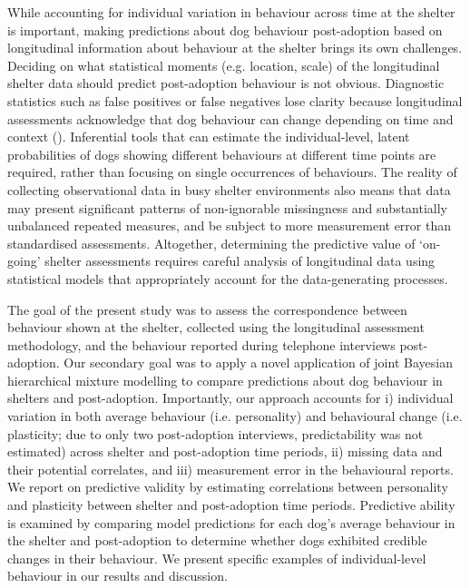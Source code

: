 \documentclass[fleqn,10pt]{wlscirep}
\begin{document}
While accounting for individual variation in behaviour across time at the shelter is important, making predictions about dog behaviour post-adoption based on longitudinal information about behaviour at the shelter brings its own challenges. Deciding on what statistical moments (e.g. location, scale) of the longitudinal shelter data should predict post-adoption behaviour is not obvious. Diagnostic statistics such as false positives or false negatives lose clarity because longitudinal assessments acknowledge that dog behaviour can change depending on time and context (\cite{goold2017modelling}). Inferential tools that can estimate the individual-level, latent probabilities of dogs showing different behaviours at different time points are required, rather than focusing on single occurrences of behaviours. The reality of collecting observational data in busy shelter environments also means that data may present significant patterns of non-ignorable missingness and substantially unbalanced repeated measures, and be subject to more measurement error than standardised assessments. Altogether, determining the predictive value of `on-going' shelter assessments requires careful analysis of longitudinal data using statistical models that appropriately account for the data-generating processes.

The goal of the present study was to assess the correspondence between behaviour shown at the shelter, collected using the longitudinal assessment methodology, and the behaviour reported during telephone interviews post-adoption. Our secondary goal was to apply a novel application of joint Bayesian hierarchical mixture modelling to compare predictions about dog behaviour in shelters and post-adoption. Importantly, our approach accounts for i) individual variation in both average behaviour (i.e. personality) and behavioural change (i.e. plasticity; due to only two post-adoption interviews, predictability was not estimated) across shelter and post-adoption time periods, ii) missing data and their potential correlates, and iii) measurement error in the behavioural reports. We report on predictive validity by estimating correlations between personality and plasticity between shelter and post-adoption time periods. Predictive ability is examined by comparing model predictions for each dog's average behaviour in the shelter and post-adoption to determine whether dogs exhibited credible changes in their behaviour. We present specific examples of individual-level behaviour in our results and discussion.
\end{document}
